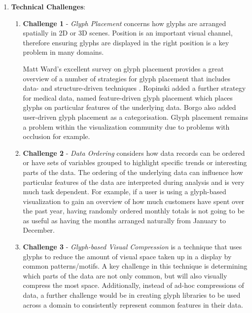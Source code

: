 \begin{enumerate}
\item \textbf{Technical Challenges}:
	\begin{enumerate}
		\item \textbf{Challenge 1} - \emph{Glyph Placement} concerns how glyphs are arranged spatially in 2D or 3D scenes.
		Position is an important visual channel, therefore ensuring glyphs are displayed in the right position is a key problem in many domains.
		
		Matt Ward's excellent survey on glyph placement provides a great overview of a number of strategies for glyph placement that includes data- and structure-driven techniques \cite{ward02}.
		Ropinski \cite{ropinski11} added a further strategy for medical data, named feature-driven glyph placement which places glyphs on particular features of the underlying data.
		Borgo \etal \cite{Borgo:2013:EG} also added user-driven glyph placement as a categorisation.
		Glyph placement remains a problem within the visualization community due to problems with occlusion for example.
		
		\item \textbf{Challenge 2} - \emph{Data Ordering} considers how data records can be ordered or have sets of variables grouped to highlight specific trends or interesting parts of the data\cite{ward08}.
		The ordering of the underlying data can influence how particular features of the data are interpreted during analysis and is very much task dependent.
		For example, if a user is using a glyph-based visualization to gain an overview of how much customers have spent over the past year, having randomly ordered monthly totals is not going to be as useful as having the months arranged naturally from January to December.
		
		\item \textbf{Challenge 3} - \emph{Glyph-based Visual Compression} is a technique that uses glyphs to reduce the amount of visual space taken up in a display by common patterns/motifs.
		A key challenge in this technique is determining which parts of the data are not only common, but will also visually compress the most space.
		Additionally, instead of ad-hoc compressions of data, a further challenge would be in creating glyph libraries to be used across a domain to consistently represent common features in their data.
		

\end{enumerate}
\end{enumerate}
